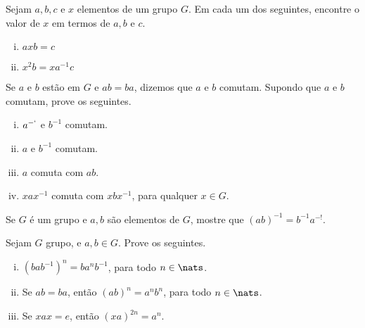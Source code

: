 \begin{exercise}
Sejam $a,b,c$ e $x$ elementos de um grupo $G$. Em cada um dos seguintes, encontre o valor de $x$ em termos de $a,b$ e $c$.

\begin{enumerate}[(i)]
    \item $axb = c$
    \item $x^2b = xa^{-1}c$
\end{enumerate}
\end{exercise}

\begin{exercise}
Se $a$ e $b$ estão em $G$ e $ab = ba$, dizemos que $a$ e $b$ comutam. Supondo que $a$ e $b$ comutam, prove os seguintes.

\begin{enumerate}[(i)]
    \item $a^{-`}$ e $b^{-1}$ comutam.
    \item $a$ e $b^{-1}$ comutam.
    \item $a$ comuta com $ab$.
    \item $xax^{-1}$ comuta com $xbx^{-1}$, para qualquer $x \in G$.
\end{enumerate}

\end{exercise}

\begin{exercise}
Se $G$ é um grupo e $a,b$ são elementos de $G$, mostre que $(ab)^{-1} = b^{-1} a^{-!}$.
\end{exercise}

\begin{exercise}
Sejam $G$ grupo, e $a,b \in G$. Prove os seguintes.

\begin{enumerate}[(i)]
    \item $(bab^{-1})^n = ba^nb^{-1}$, para todo $n \in \nats$.
    \item Se $ab=ba$, então $(ab)^n = a^nb^n$, para todo $n \in \nats$.
    \item Se $xax = e$, então $(xa)^{2n} = a^n$.
\end{enumerate}

\end{exercise}
